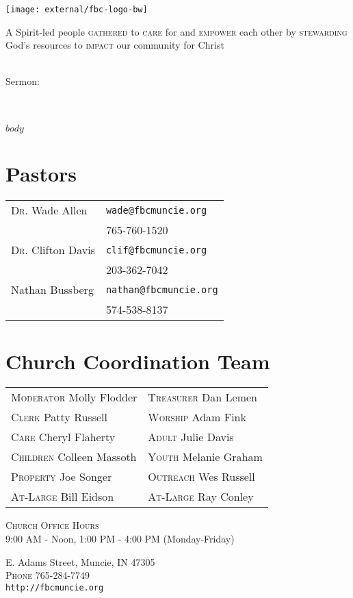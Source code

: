 \documentclass[
notumble,
nofoldmark,
letterpaper,
]{leaflet}
\begin{document}
\begin{titlepage}
\centering
\vfill
{\centering
\texttt{[image: external/fbc-logo-bw]}\par}
\vfill
\large A Spirit-led people \textsc{gathered} to \textsc{care} for and \textsc{empower} each other by  \textsc{stewarding} God's resources to \textsc{impact} our community for Christ
\vfill

\LARGE\sundaydate\\
\vfill
\large Sermon:\\
\LARGE\sermontitle\\
\LARGE\scripture\\

\vfill
\end{titlepage}
\thispagestyle{empty}

$body$

\vfill

\section{Pastors}
\begin{tabular}{@{}ll}
\textsc{Dr.} Wade Allen & \verb|wade@fbcmuncie.org|\\ 
 & 765-760-1520 \\
 \textsc{Dr.} Clifton Davis & \verb|clif@fbcmuncie.org|\\ 
 & 203-362-7042 \\
 Nathan Bussberg & \verb|nathan@fbcmuncie.org|\\ 
 & 574-538-8137 \\
\end{tabular}
\section{Church Coordination Team}
\begin{tabular}{@{}ll}
\textsc{Moderator} Molly Flodder & \textsc{Treasurer} Dan Lemen\\
\textsc{Clerk} Patty Russell & \textsc{Worship} Adam Fink\\
\textsc{Care} Cheryl Flaherty & \textsc{Adult} Julie Davis \\
\textsc{Children} Colleen Massoth & \textsc{Youth} Melanie Graham \\
\textsc{Property} Joe Songer & \textsc{Outreach} Wes Russell \\
\textsc{At-Large} Bill Eidson & \textsc{At-Large} Ray Conley \\
\end{tabular}

\medskip

\centering
\textsc{Church Office Hours} \\
9:00 AM - Noon, 1:00 PM - 4:00 PM (Monday-Friday)

\medskip

 E. Adams Street, Muncie, IN 47305\\
\textsc{Phone} 765-284-7749\\
\texttt{http://fbcmuncie.org}

\loggingall
\end{document}
